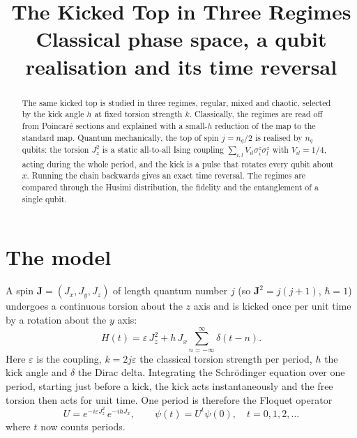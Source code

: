 \documentclass[11pt,a4paper]{article}
\title{The Kicked Top in Three Regimes\\[0.3em]
  \large Classical phase space, a qubit realisation and its time reversal}
\author{}
\date{}
\begin{document}
\maketitle

\begin{abstract}
The same kicked top is studied in three regimes, regular, mixed and chaotic, selected by the kick angle $h$ at
fixed torsion strength $k$. Classically, the regimes are read off from Poincar\'e sections and explained with a
small-$h$ reduction of the map to the standard map. Quantum mechanically, the top of spin $j=n_q/2$ is realised by
$n_q$ qubits: the torsion $J_z^2$ is a static all-to-all Ising coupling $\sum_{i,l}V_{il}\sigma^z_i\sigma^z_l$ with
$V_{il}=1/4$, acting during the whole period, and the kick is a pulse that rotates every qubit about $x$. Running the
chain backwards gives an exact time reversal. The regimes are compared through the Husimi distribution, the fidelity
and the entanglement of a single qubit.
\end{abstract}

\tableofcontents

\section{The model}\label{sec:model}

A spin $\bm J=(J_x,J_y,J_z)$ of length quantum number $j$ (so $\bm J^2=j(j+1)$, $\hbar=1$) undergoes a continuous
torsion about the $z$ axis and is kicked once per unit time by a rotation about the $y$ axis:
\begin{equation}\label{eq:H}
  H(t) = \varepsilon\,J_z^2 + h\,J_x\sum_{n=-\infty}^{\infty}\delta(t-n).
\end{equation}
Here $\varepsilon$ is the coupling, $k = 2j\varepsilon$ the classical torsion strength per period, $h$ the kick angle and $\delta$ the Dirac delta. Integrating the
Schr\"odinger equation over one period, starting just before a kick, the kick acts instantaneously and the free
torsion then acts for unit time. One period is therefore the Floquet operator
\begin{equation}\label{eq:U}
  U = e^{-i\varepsilon J_z^2}\,e^{-ihJ_x},\qquad \psi(t) = U^t\psi(0),\quad t=0,1,2,\dots
\end{equation}
where $t$ now counts periods.
\end{document}
